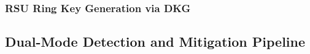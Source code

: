 \subsubsection{RSU Ring Key Generation via DKG}

\subsection{Dual-Mode Detection and Mitigation Pipeline}
\label{sec:dual_mode}



